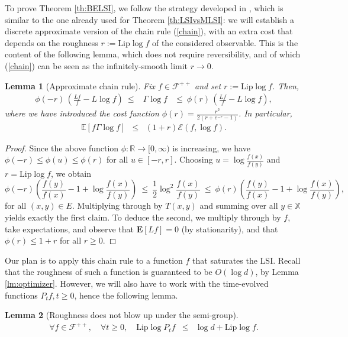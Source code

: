 \documentclass[12pt,final]{article}
\newtheorem{lemma}{Lemma}[section]
\numberwithin{equation}{section}
\newcommand{\Lip}{\mathrm {Lip}}
\newcommand{\dR}{\mathbb {R}}
\newcommand{\EE}{{\mathbb{E}}}
\newcommand{\bE}{{\mathbf{E}}}
\newcommand{\cE}{\mathscr {E}}
\newcommand{\cF}{\mathcal {F}}
\newcommand{\dX}{\mathbb{X}}
\begin{document}
To prove Theorem \ref{th:BELSI}, we follow the strategy developed in \cite{salez2025intrinsicregularitydiscretelogsobolev}, which is similar to the one already used for Theorem \ref{th:LSIvsMLSI}: we will establish a discrete approximate version of the chain rule (\ref{chain}), with an extra cost that depends on the roughness $r:=\Lip\log f$ of the considered observable. This is the content of the following lemma, which does not require reversibility, and of which (\ref{chain}) can be seen as the infinitely-smooth limit $r\to 0$. 
\begin{lemma}[Approximate chain rule]\label{lm:chain}Fix $f\in\cF^{++}$ and set $r:=\Lip \log f$. Then,
\begin{eqnarray*}
\phi(-r)\,\left(\frac{Lf}{f}-L\log f\right)\ \le & \Gamma \log f & \le \ \phi(r)\,\left(\frac{Lf}{f}-L\log f\right),
\end{eqnarray*}
where we have introduced the cost function $\phi(r)  = \frac{r^2}{2\left(r +e^{-r}-1\right)}$. In particular, 
\begin{eqnarray*}
\EE\left[f\Gamma \log f\right] & \le & \left(1+r\right)\cE(f,\log f).
\end{eqnarray*}
\end{lemma}
\begin{proof}
Since the above function $\phi\colon\dR\to[0,\infty)$  is  increasing, we have $\phi(-r)\le \phi(u)\le\phi(r)$ for all $u\in[-r,r]$. Choosing $u=\log\frac{f(x)}{f(y)}$ and $r=\Lip \log f $, we obtain
\begin{equation*}
\phi(-r)\left(\frac{f(y)}{f(x)}-1+\log\frac{f(x)}{f(y)}\right) \ \le \ \frac{1}{2}\log^2\frac{f(x)}{f(y)} \ \le \ \phi(r)\left(\frac{f(y)}{f(x)}-1+\log\frac{f(x)}{f(y)}\right),
\end{equation*}
for all $(x,y)\in E$. Multiplying through by $T(x,y)$ and summing over all $y\in\dX$ yields exactly the first claim. To deduce the second, we multiply through by $f$, take expectations, and observe that $\bE[Lf]=0$ (by stationarity), and that $\phi(r)\le 1+r$ for all $r\ge 0$. 
\end{proof}
Our plan is to  apply this chain rule to a function $f$ that saturates the LSI. Recall that the roughness of such a function is guaranteed to be $O(\log d)$, by Lemma \ref{lm:optimizer}. However, we will also have to  work with the time-evolved functions $P_tf,t\ge 0$, hence the following lemma. 
\begin{lemma}[Roughness does not blow up under the semi-group]\label{lm:timeregularity}
\begin{eqnarray*}
\forall f\in\cF^{++},\quad\forall t\ge 0,\quad \Lip \log P_tf  &  \le & \log d+\Lip \log f.
\end{eqnarray*}
\end{lemma}
\end{document}
